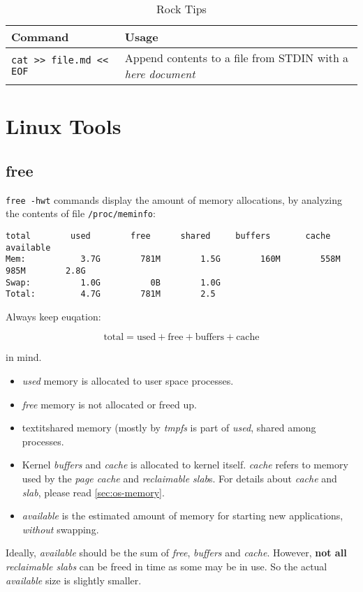 \begin{table}[!htb]
  \small
  \centering
  \begin{tabular}[!htb]{l|l}
    \toprule
    Command & Usage \\
    \midrule
    \lstinline|cat >> file.md << EOF| & Append contents to a file from STDIN with a \textit{here document} \\
    \bottomrule
  \end{tabular}
  \caption{Rock Tips}
  \label{tab:cmd-rock-tips}
\end{table}

\section{Linux Tools}
\label{sec:linux-tools}

\subsection{free}
\label{sec:linux-free}

\lstinline|free -hwt| commands display the amount of memory
allocations, by analyzing the contents of file
\lstinline|/proc/meminfo|:

\begin{lstlisting}[caption={Free Memory},label={lst:free-mem},basicstyle=\tiny\ttfamily]
              total        used        free      shared     buffers       cache   available
Mem:           3.7G        781M        1.5G        160M        558M        985M        2.8G
Swap:          1.0G          0B        1.0G
Total:         4.7G        781M        2.5
\end{lstlisting}

Always keep euqation:

$$\text{total} = \text{used} + \text{free} + \text{buffers} + \text{cache}$$

in mind.

\begin{itemize}
\item \textit{used} memory is allocated to user space processes.
\item \textit{free} memory is not allocated or freed up.
\item textit{shared} memory (mostly by \textit{tmpfs} is part of
  \textit{used}, shared among processes.
\item Kernel \textit{buffers} and \textit{cache} is allocated to
  kernel itself. \textit{cache} refers to memory used by the
  \textit{page cache} and \textit{reclaimable slab}s. For details
  about \textit{cache} and \textit{slab}, please read
  \ref{sec:os-memory}.
\item \textit{available} is the estimated amount of memory for
  starting new applications, \textit{without} swapping.
\end{itemize}

Ideally, \textit{available} should be the sum of \textit{free},
\textit{buffers} and \textit{cache}. However, \textbf{not all}
\textit{reclaimable slabs} can be freed in time as some may be in
use. So the actual \textit{available} size is slightly smaller.


